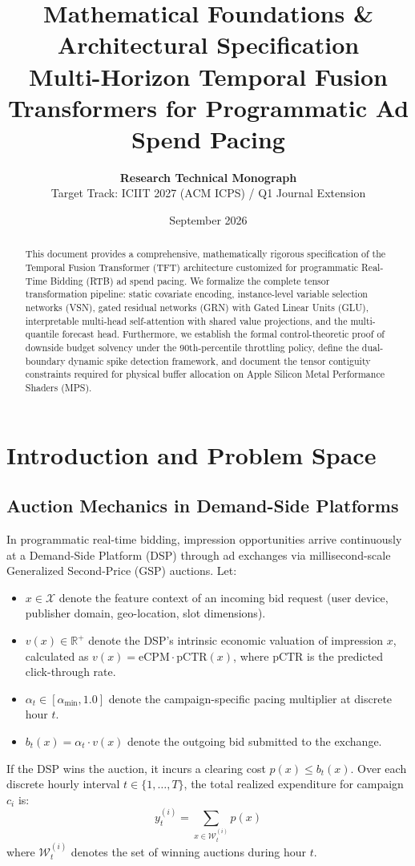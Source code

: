 \documentclass[11pt,a4paper]{article}
\title{\LARGE \textbf{Mathematical Foundations \& Architectural Specification}\\
\Large \textbf{Multi-Horizon Temporal Fusion Transformers for Programmatic Ad Spend Pacing}}
\author{\textbf{Research Technical Monograph} \\
Target Track: ICIIT 2027 (ACM ICPS) / Q1 Journal Extension}
\date{September 2026}
\begin{document}
\maketitle

\begin{abstract}
This document provides a comprehensive, mathematically rigorous specification of the Temporal Fusion Transformer (TFT) architecture customized for programmatic Real-Time Bidding (RTB) ad spend pacing. We formalize the complete tensor transformation pipeline: static covariate encoding, instance-level variable selection networks (VSN), gated residual networks (GRN) with Gated Linear Units (GLU), interpretable multi-head self-attention with shared value projections, and the multi-quantile forecast head. Furthermore, we establish the formal control-theoretic proof of downside budget solvency under the 90th-percentile throttling policy, define the dual-boundary dynamic spike detection framework, and document the tensor contiguity constraints required for physical buffer allocation on Apple Silicon Metal Performance Shaders (MPS).
\end{abstract}

\tableofcontents
\newpage

\section{Introduction and Problem Space}

\subsection{Auction Mechanics in Demand-Side Platforms}
In programmatic real-time bidding, impression opportunities arrive continuously at a Demand-Side Platform (DSP) through ad exchanges via millisecond-scale Generalized Second-Price (GSP) auctions. Let:
\begin{itemize}
    \item $x \in \mathcal{X}$ denote the feature context of an incoming bid request (user device, publisher domain, geo-location, slot dimensions).
    \item $v(x) \in \mathbb{R}^+$ denote the DSP's intrinsic economic valuation of impression $x$, calculated as $v(x) = \text{eCPM} \cdot \text{pCTR}(x)$, where $\text{pCTR}$ is the predicted click-through rate.
    \item $\alpha_t \in [\alpha_{\min}, 1.0]$ denote the campaign-specific pacing multiplier at discrete hour $t$.
    \item $b_t(x) = \alpha_t \cdot v(x)$ denote the outgoing bid submitted to the exchange.
\end{itemize}
If the DSP wins the auction, it incurs a clearing cost $p(x) \le b_t(x)$. Over each discrete hourly interval $t \in \{1, \dots, T\}$, the total realized expenditure for campaign $c_i$ is:
\begin{equation}
    y_t^{(i)} = \sum_{x \in \mathcal{W}_t^{(i)}} p(x)
\end{equation}
where $\mathcal{W}_t^{(i)}$ denotes the set of winning auctions during hour $t$.
\end{document}
